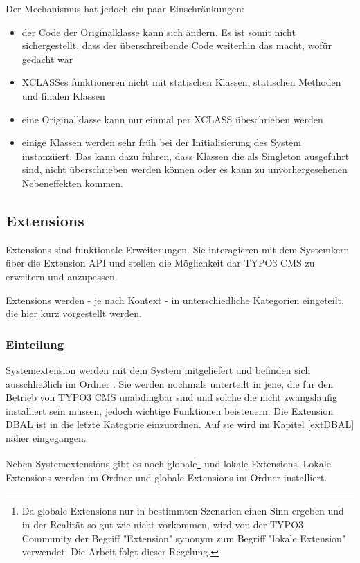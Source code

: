 Der Mechanismus hat jedoch ein paar Einschränkungen:

\begin{itemize}
	\itemsep1pt\parskip0pt
	\item
		der Code der Originalklasse kann sich ändern. Es ist somit nicht sichergestellt, dass der überschreibende Code weiterhin das macht, wofür gedacht war
	\item
		XCLASSes funktioneren nicht mit statischen Klassen, statischen Methoden und finalen Klassen
	\item
		eine Originalklasse kann nur einmal per XCLASS übeschrieben werden
	\item
		einige Klassen werden sehr früh bei der Initialisierung des System instanziiert. Das kann dazu führen, dass Klassen die als Singleton ausgeführt sind, nicht überschrieben werden können oder es kann zu unvorhergesehenen Nebeneffekten kommen.
\end{itemize}

\subsection{Extensions}
Extensions sind funktionale Erweiterungen. Sie interagieren mit dem Systemkern über die Extension API und stellen die Möglichkeit dar TYPO3 CMS zu erweitern und anzupassen.

Extensions werden - je nach Kontext - in unterschiedliche Kategorien eingeteilt, die hier kurz vorgestellt werden.

\subsubsection{Einteilung}
\label{subsubsec:sysext}
Systemextension werden mit dem System mitgeliefert und befinden sich ausschließlich im Ordner . Sie werden nochmals unterteilt in jene, die für den Betrieb von TYPO3 CMS unabdingbar sind und solche die nicht zwangsläufig installiert sein müssen, jedoch wichtige Funktionen beisteuern. Die Extension DBAL ist in die letzte Kategorie einzuordnen. Auf sie wird im Kapitel \ref{extDBAL} näher eingegangen.

Neben Systemextensions gibt es noch globale\footnote{Da globale Extensions nur in bestimmten Szenarien einen Sinn ergeben und in der Realität so gut wie nicht vorkommen, wird von der TYPO3 Community der Begriff "Extension" synonym zum Begriff "lokale Extension" verwendet. Die Arbeit folgt dieser Regelung.} und lokale Extensions. Lokale Extensions werden im Ordner  und globale Extensions im Ordner  installiert.

